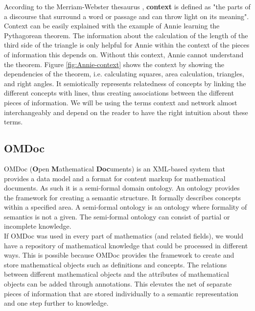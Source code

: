 \documentclass[twoside, 12pt]{article}
\begin{document}
According to the Merriam-Webster thesaurus \cite{Webster:npentrel14}, \textbf{context} is defined as "the parts of a discourse that surround a word or passage and can throw light on its meaning". Context can be easily explained with the example of Annie learning the Pythagorean theorem. The information about the calculation of the length of the third side of the triangle is only helpful for Annie within the context of the pieces of information this depends on. Without this context, Annie cannot understand the theorem. Figure \ref{fig:Annie-context} shows the context by showing the dependencies of the theorem, i.e. calculating squares, area calculation, triangles, and right angles. It semiotically represents relatedness of concepts by linking the different concepts with lines, thus creating associations between the different pieces of information. We will be using the terms context and network almost interchangeably and depend on the reader to have the right intuition about these terms.\\

\subsection{OMDoc}
\label{sec:OMDoc}

OMDoc (\textbf{O}pen \textbf{M}athematical \textbf{Doc}uments) \cite{Kohlhase:OMDoc1.2} is an XML-based system that provides a data model and a format for content markup for mathematical documents. As such it is a semi-formal domain ontology. An ontology provides the framework for creating a semantic structure. It formally describes concepts within a specified area. A semi-formal ontology \cite{Sheth:npentrel14} is an ontology where formality of semantics is not a given. The semi-formal ontology can consist of partial or incomplete knowledge. \\

If OMDoc was used in every part of mathematics (and related fields), we would have a repository of mathematical knowledge that could be processed in different ways. This is possible because OMDoc provides the framework to create and store mathematical objects such as definitions and concepts. The relations between different mathematical objects and the attributes of mathematical objects can be added through annotations. This elevates the net of separate pieces of information that are stored individually to a semantic representation and one step further to knowledge.\\
\end{document}
